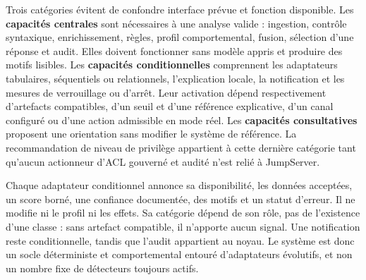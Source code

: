 \documentclass[11pt,a4paper,oneside]{report}
\theoremstyle{definition}
\theoremstyle{plain}
\begin{document}
Trois catégories évitent de confondre interface prévue et fonction disponible.
Les \textbf{capacités centrales} sont nécessaires à une analyse valide :
ingestion, contrôle syntaxique, enrichissement, règles, profil comportemental, fusion,
sélection d'une réponse et audit. Elles doivent fonctionner sans modèle appris
et produire des motifs lisibles. Les \textbf{capacités conditionnelles}
comprennent les adaptateurs tabulaires, séquentiels ou relationnels,
l'explication locale, la notification et les mesures de verrouillage ou
d'arrêt. Leur activation dépend respectivement d'artefacts compatibles, d'un
seuil et d'une référence explicative, d'un canal configuré ou d'une action
admissible en mode réel. Les \textbf{capacités consultatives} proposent une
orientation sans modifier le système de référence. La recommandation de niveau
de privilège appartient à cette dernière catégorie tant qu'aucun actionneur
d'ACL gouverné et audité n'est relié à JumpServer.

Chaque adaptateur conditionnel annonce sa disponibilité, les données acceptées,
un score borné, une confiance documentée, des motifs et un statut d'erreur. Il
ne modifie ni le profil ni les effets. Sa catégorie dépend de son rôle, pas de
l'existence d'une classe : sans artefact compatible, il n'apporte aucun signal.
Une notification reste conditionnelle, tandis que l'audit appartient au noyau.
Le système est donc un socle déterministe et comportemental entouré
d'adaptateurs évolutifs, et non un nombre fixe de détecteurs toujours actifs.
\end{document}
